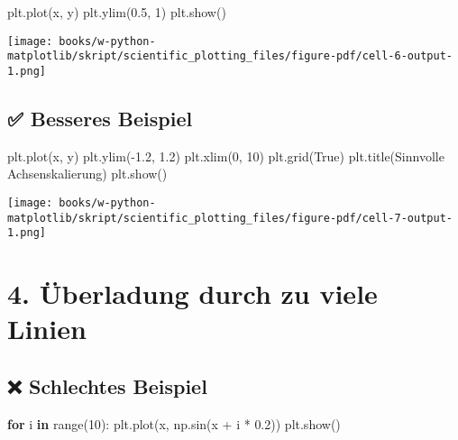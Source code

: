 \documentclass[
  letterpaper,
  DIV=11,
  numbers=noendperiod]{scrreprt}
\newenvironment{Shaded}{\begin{snugshade}}{\end{snugshade}}
\newcommand{\BuiltInTok}[1]{\textcolor[rgb]{0.00,0.23,0.31}{#1}}
\newcommand{\ControlFlowTok}[1]{\textcolor[rgb]{0.00,0.23,0.31}{\textbf{#1}}}
\newcommand{\DecValTok}[1]{\textcolor[rgb]{0.68,0.00,0.00}{#1}}
\newcommand{\FloatTok}[1]{\textcolor[rgb]{0.68,0.00,0.00}{#1}}
\newcommand{\KeywordTok}[1]{\textcolor[rgb]{0.00,0.23,0.31}{\textbf{#1}}}
\newcommand{\NormalTok}[1]{\textcolor[rgb]{0.00,0.23,0.31}{#1}}
\newcommand{\OperatorTok}[1]{\textcolor[rgb]{0.37,0.37,0.37}{#1}}
\newcommand{\StringTok}[1]{\textcolor[rgb]{0.13,0.47,0.30}{#1}}
\newcommand{\VariableTok}[1]{\textcolor[rgb]{0.07,0.07,0.07}{#1}}
\begin{document}
\begin{tcolorbox}
\begin{Shaded}
\begin{Highlighting}[]
\NormalTok{plt.plot(x, y)}
\NormalTok{plt.ylim(}\FloatTok{0.5}\NormalTok{, }\DecValTok{1}\NormalTok{)}
\NormalTok{plt.show()}
\end{Highlighting}
\end{Shaded}

\texttt{[image: books/w-python-matplotlib/skript/scientific\_plotting\_files/figure-pdf/cell-6-output-1.png]}

\subsection{✅ Besseres Beispiel}\label{besseres-beispiel-2}

\begin{Shaded}
\begin{Highlighting}[]
\NormalTok{plt.plot(x, y)}
\NormalTok{plt.ylim(}\OperatorTok{{-}}\FloatTok{1.2}\NormalTok{, }\FloatTok{1.2}\NormalTok{)}
\NormalTok{plt.xlim(}\DecValTok{0}\NormalTok{, }\DecValTok{10}\NormalTok{)}
\NormalTok{plt.grid(}\VariableTok{True}\NormalTok{)}
\NormalTok{plt.title(}\StringTok{\textquotesingle{}Sinnvolle Achsenskalierung\textquotesingle{}}\NormalTok{)}
\NormalTok{plt.show()}
\end{Highlighting}
\end{Shaded}

\texttt{[image: books/w-python-matplotlib/skript/scientific\_plotting\_files/figure-pdf/cell-7-output-1.png]}

\section{4. Überladung durch zu viele
Linien}\label{uxfcberladung-durch-zu-viele-linien}

\subsection{❌ Schlechtes Beispiel}\label{schlechtes-beispiel-3}

\begin{Shaded}
\begin{Highlighting}[]
\ControlFlowTok{for}\NormalTok{ i }\KeywordTok{in} \BuiltInTok{range}\NormalTok{(}\DecValTok{10}\NormalTok{):}
\NormalTok{    plt.plot(x, np.sin(x }\OperatorTok{+}\NormalTok{ i }\OperatorTok{*} \FloatTok{0.2}\NormalTok{))}
\NormalTok{plt.show()}
\end{Highlighting}
\end{Shaded}


\end{tcolorbox}
\end{document}
